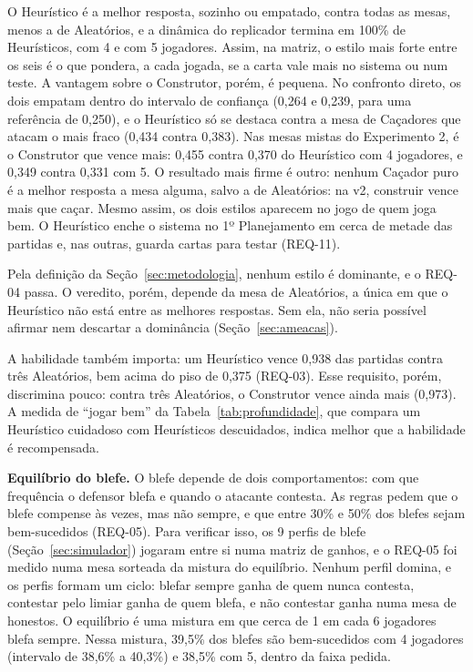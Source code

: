 O Heurístico é a melhor resposta, sozinho ou empatado, contra todas as mesas, menos a de Aleatórios, e a dinâmica
do replicador termina em 100\% de Heurísticos, com 4 e com 5 jogadores. Assim, na matriz, o estilo mais
forte entre os seis é o que pondera, a cada jogada, se a carta vale mais no sistema ou num teste. A vantagem
sobre o Construtor, porém, é pequena. No confronto direto, os dois empatam dentro do intervalo de confiança
(0,264 e 0,239, para uma referência de 0,250), e o Heurístico só se destaca contra a mesa de Caçadores que atacam
o mais fraco (0,434 contra 0,383). Nas mesas mistas do Experimento 2, é o Construtor que vence mais: 0,455 contra
0,370 do Heurístico com 4 jogadores, e 0,349 contra 0,331 com 5. O resultado mais firme é outro: nenhum Caçador
puro é a melhor resposta a mesa alguma,
salvo a de Aleatórios: na v2, construir vence mais que caçar. Mesmo assim, os dois estilos aparecem no
jogo de quem joga bem. O Heurístico enche o sistema no 1º Planejamento em cerca de metade das partidas e, nas
outras, guarda cartas para testar (REQ-11).

Pela definição da Seção~\ref{sec:metodologia}, nenhum estilo é dominante, e o REQ-04 passa. O veredito,
porém, depende da mesa de Aleatórios, a única em que o Heurístico não está entre as melhores respostas. Sem ela,
não seria possível afirmar nem descartar a dominância (Seção~\ref{sec:ameacas}).

A habilidade também importa: um Heurístico vence 0,938 das partidas contra três
Aleatórios, bem acima do piso de 0,375 (REQ-03). Esse requisito, porém, discrimina pouco: contra três
Aleatórios, o Construtor vence ainda mais (0,973). A medida de ``jogar bem'' da Tabela~\ref{tab:profundidade},
que compara um Heurístico cuidadoso com Heurísticos descuidados, indica melhor que a habilidade é recompensada.

\textbf{Equilíbrio do blefe.} O blefe depende de dois comportamentos: com que frequência o defensor blefa e quando
o atacante contesta. As regras pedem que o blefe compense às vezes, mas não sempre, e que entre 30\% e 50\% dos
blefes sejam bem-sucedidos (REQ-05). Para verificar isso, os 9 perfis de blefe (Seção~\ref{sec:simulador}) jogaram entre si
numa matriz de ganhos, e o REQ-05 foi medido numa mesa sorteada da mistura do equilíbrio.
Nenhum perfil domina, e os perfis formam um ciclo: blefar sempre ganha de quem nunca contesta, contestar pelo
limiar ganha de quem blefa, e não contestar ganha numa mesa de honestos. O equilíbrio é uma mistura em que cerca
de 1 em cada 6 jogadores blefa sempre. Nessa mistura, 39,5\% dos blefes são bem-sucedidos com 4
jogadores (intervalo de
38,6\% a 40,3\%) e 38,5\% com 5, dentro da faixa pedida.

